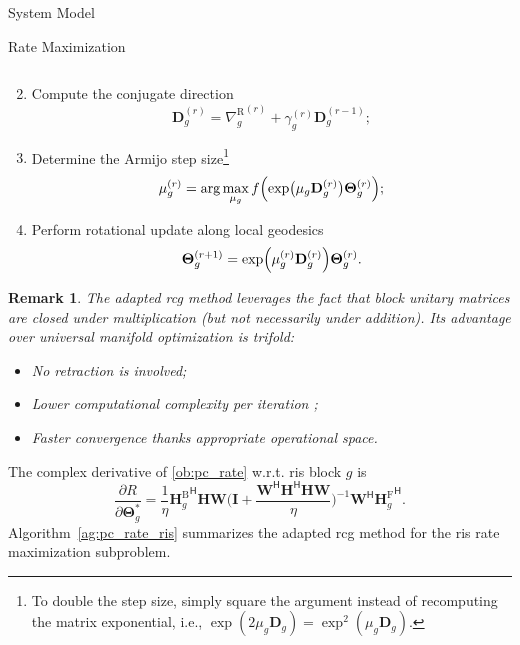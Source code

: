 \documentclass[journal]{IEEEtran}
\newtheorem{remark}{Remark}
\begin{document}
\begin{section}{System Model}
\begin{subsection}{Rate Maximization}
\begin{enumerate}
\begin{equation}
				\label{eq:rcg_weight}
			\end{equation}
			\item Compute the conjugate direction
			\begin{equation}
				\mathbf{D}_g^{(r)} = {\nabla_g^\mathrm{R}}^{(r)} + \gamma_g^{(r)} \mathbf{D}_g^{(r-1)};
				\label{eq:rcg_direction}
			\end{equation}
			\item Determine the Armijo step size\footnote{To double the step size, simply square the argument instead of recomputing the matrix exponential, i.e., $\exp(2 \mu_g \mathbf{D}_g) = \exp^2(\mu_g \mathbf{D}_g)$.}
			\begin{equation}
				\mu_g^{(r)} = \arg\max_{\mu_g} f\Bigl(\exp\bigl(\mu_g \mathbf{D}_g^{(r)}\bigr) \mathbf{\Theta}_g^{(r)}\Bigr);
				\label{eq:rcg_step}
			\end{equation}
			\item Perform rotational update along local geodesics
			\begin{equation}
				\mathbf{\Theta}_g^{(r+1)} = \exp\Bigl(\mu_g^{(r)} \mathbf{D}_g^{(r)}\Bigr) \mathbf{\Theta}_g^{(r)}.
				\label{eq:rcg_update}
			\end{equation}
		\end{enumerate}

		\begin{remark}
			The adapted \gls{rcg} method leverages the fact that block unitary matrices are closed under multiplication (but not necessarily under addition).
			Its advantage over universal manifold optimization \cite{Absil2009,Pan2022d} is trifold:
			\begin{itemize}
				\item No retraction is involved;
				\item Lower computational complexity per iteration \cite{Abrudan2008};
				\item Faster convergence thanks appropriate operational space.
			\end{itemize}
		\end{remark}

		The complex derivative of \eqref{ob:pc_rate} w.r.t. \gls{ris} block $g$ is
		\begin{equation}
			\frac{\partial R}{\partial \mathbf{\Theta}_g^*} = \frac{1}{\eta} {\mathbf{H}_g^\mathrm{B}}^\mathsf{H} \mathbf{HW} \biggl(\mathbf{I} + \frac{\mathbf{W}^\mathsf{H}\mathbf{H}^\mathsf{H}\mathbf{H}\mathbf{W}}{\eta}\biggr)^{-1} \mathbf{W}^\mathsf{H} {\mathbf{H}_g^\mathrm{F}}^\mathsf{H}.
			\label{eq:pc_rate_gradient_ris}
		\end{equation}
		Algorithm~\ref{ag:pc_rate_ris} summarizes the adapted \gls{rcg} method for the \gls{ris} rate maximization subproblem.


\end{subsection}
\end{section}
\end{document}
